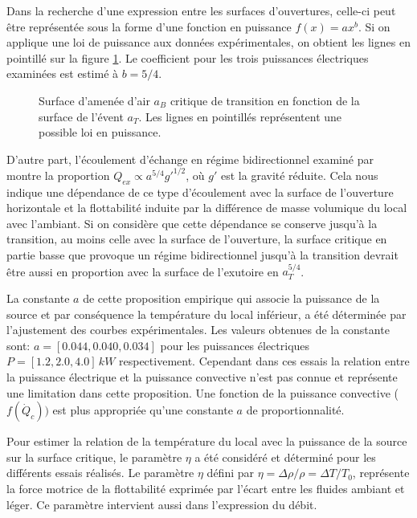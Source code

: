 Dans la recherche d'une expression entre les surfaces d'ouvertures, celle-ci peut être représentée sous la forme d'une fonction en puissance $f(x)=ax^b$. Si on applique une loi de puissance aux données expérimentales, on obtient les lignes en pointillé sur la figure \ref{fig:ab_bidi_visu_fit}. Le coefficient pour les trois puissances électriques examinées est estimé à $b=5/4$.

\begin{figure}
\centering
\resizebox{0.67\textwidth}{!}{}
\caption{Surface d'amenée d'air $a_B$ critique de transition en fonction de la surface de l'évent $a_T$. Les lignes en pointillés représentent une possible loi en puissance.}
\label{fig:ab_bidi_visu_fit}
\end{figure}

D'autre part, l'écoulement d'échange en régime bidirectionnel examiné par \textcite{epstein_1988} montre la proportion $Q_{ex} \propto a^ {5/4} g'^{1/2}$, où $g'$ est la gravité réduite. Cela nous indique une dépendance de ce type d'écoulement avec la surface de l'ouverture horizontale et la flottabilité induite par la différence de masse volumique du local avec l'ambiant. Si on considère que cette dépendance se conserve jusqu'à la transition, au moins celle avec la surface de l'ouverture, la surface critique en partie basse que provoque un régime bidirectionnel jusqu'à la transition devrait être aussi en proportion avec la surface de l'exutoire en $a_T^{5/4}$.

La constante $a$ de cette proposition empirique qui associe la puissance de la source et par conséquence la température du local inférieur, a été déterminée par l'ajustement des courbes expérimentales. Les valeurs obtenues de la constante sont: $a=[0.044,0.040,0.034]$ pour les puissances électriques $P=[1.2,2.0,4.0]\,\si{kW}$ respectivement. Cependant dans ces essais la relation entre la puissance électrique et la puissance convective n'est pas connue et représente une limitation dans cette proposition. Une fonction de la puissance convective ($f(\dot{Q}_c))$ est plus appropriée qu'une constante $a$ de proportionnalité.

Pour estimer la relation de la température du local avec la puissance de la source sur la surface critique, le paramètre $\eta$ a été considéré et déterminé pour les différents essais réalisés. Le paramètre $\eta$ défini par $\eta=\Delta \rho/\rho = \Delta T /T_0$, représente la force motrice de la flottabilité exprimée par l'écart entre les fluides ambiant et léger. Ce paramètre intervient aussi dans l'expression du débit.

